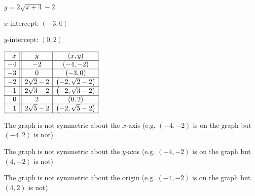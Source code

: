 {$y = 2 \sqrt{x+4} - 2$}
{$x$-intercept: $(-3,0)$  \smallskip

$y$-intercept: $(0,2)$ \smallskip

$\begin{array}{|r||c|c|}  

\hline
 x &  y & (x,y) \\ \hline
-4 & -2 & (-4, -2) \\ \hline
-3 & 0 & (-3,0 ) \\  \hline
-2 & 2 \sqrt{2} -2 & \left(-2, \sqrt{2} -2 \right) \\ \hline
 -1 & 2 \sqrt{3} -2 & \left(-2, \sqrt{3} -2 \right) \\ \hline
 0 & 2 & (0, 2) \\ \hline
 1 & 2 \sqrt{5} -2 & \left(-2, \sqrt{5} -2 \right) \\ \hline
 
\end{array} $ \smallskip


\smallskip

The graph is not symmetric about the $x$-axis (e.g. $(-4, -2)$ is on the graph but $(-4, 2)$ is not) \smallskip

The graph is not symmetric about the $y$-axis (e.g. $(-4, -2)$ is on the graph but $(4, -2)$ is not) \smallskip

The graph is not symmetric about the origin (e.g. $(-4, -2)$ is on the graph but $(4, 2)$ is not)
}